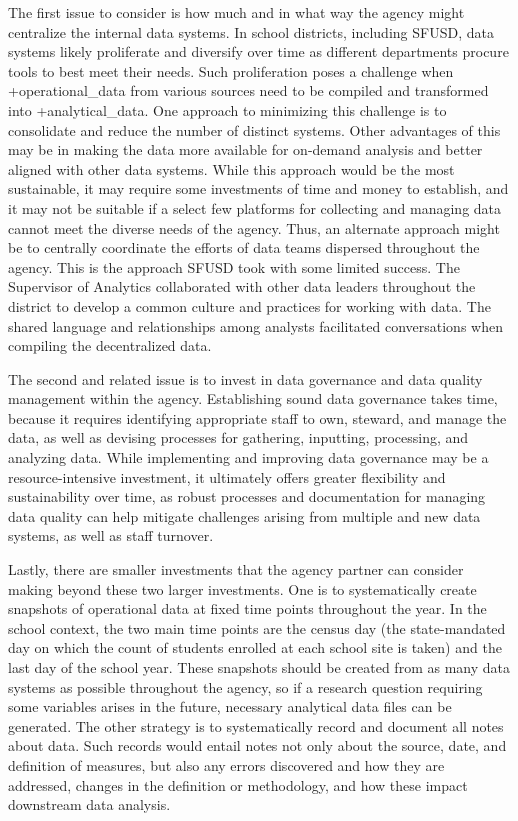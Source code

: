 \documentclass[
]{WileySix}
\begin{document}
The first issue to consider is how much and in what way the agency might centralize the internal data systems. In school districts, including SFUSD, data systems likely proliferate and diversify over time as different departments procure tools to best meet their needs. Such proliferation poses a challenge when +operational\_data\textbar{} from various sources need to be compiled and transformed into +analytical\_data\textbar. One approach to minimizing this challenge is to consolidate and reduce the number of distinct systems. Other advantages of this may be in making the data more available for on-demand analysis and better aligned with other data systems. While this approach would be the most sustainable, it may require some investments of time and money to establish, and it may not be suitable if a select few platforms for collecting and managing data cannot meet the diverse needs of the agency. Thus, an alternate approach might be to centrally coordinate the efforts of data teams dispersed throughout the agency. This is the approach SFUSD took with some limited success. The Supervisor of Analytics collaborated with other data leaders throughout the district to develop a common culture and practices for working with data. The shared language and relationships among analysts facilitated conversations when compiling the decentralized data.

The second and related issue is to invest in data governance and data quality management within the agency. Establishing sound data governance takes time, because it requires identifying appropriate staff to own, steward, and manage the data, as well as devising processes for gathering, inputting, processing, and analyzing data. While implementing and improving data governance may be a resource-intensive investment, it ultimately offers greater flexibility and sustainability over time, as robust processes and documentation for managing data quality can help mitigate challenges arising from multiple and new data systems, as well as staff turnover.

Lastly, there are smaller investments that the agency partner can consider making beyond these two larger investments. One is to systematically create snapshots of operational data at fixed time points throughout the year. In the school context, the two main time points are the census day (the state-mandated day on which the count of students enrolled at each school site is taken) and the last day of the school year. These snapshots should be created from as many data systems as possible throughout the agency, so if a research question requiring some variables arises in the future, necessary analytical data files can be generated. The other strategy is to systematically record and document all notes about data. Such records would entail notes not only about the source, date, and definition of measures, but also any errors discovered and how they are addressed, changes in the definition or methodology, and how these impact downstream data analysis.
\end{document}
